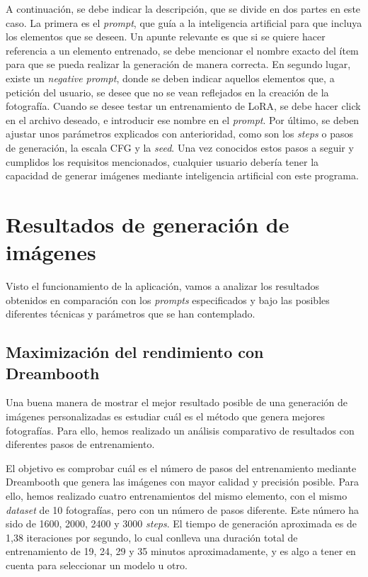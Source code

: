 A continuación, se debe indicar la descripción, que se divide en dos partes en este caso. La primera es el \textit{prompt}, que guía a la inteligencia artificial para que incluya los elementos que se deseen. Un apunte relevante es que si se quiere hacer referencia a un elemento entrenado, se debe mencionar el nombre exacto del ítem para que se pueda realizar la generación de manera correcta. En segundo lugar, existe un \textit{negative prompt}, donde se deben indicar aquellos elementos que, a petición del usuario, se desee que no se vean reflejados en la creación de la fotografía. Cuando se desee testar un entrenamiento de LoRA, se debe hacer click en el archivo deseado, e introducir ese nombre en el \textit{prompt}. Por último, se deben ajustar unos parámetros explicados con anterioridad, como son los \textit{steps} o pasos de generación, la escala CFG y la \textit{seed}. Una vez conocidos estos pasos a seguir y cumplidos los requisitos mencionados, cualquier usuario debería tener la capacidad de generar imágenes mediante inteligencia artificial con este programa.\\ 

\section{Resultados de generación de imágenes}

Visto el funcionamiento de la aplicación, vamos a analizar los resultados obtenidos en comparación con los \textit{prompts} especificados y bajo las posibles diferentes técnicas y parámetros que se han contemplado.


\subsection{Maximización del rendimiento con Dreambooth}

Una buena manera de mostrar el mejor resultado posible de una generación de imágenes personalizadas es estudiar cuál es el método que genera mejores fotografías. Para ello, hemos realizado un análisis comparativo de resultados con diferentes pasos de entrenamiento.

El objetivo es comprobar cuál es el número de pasos del entrenamiento mediante Dreambooth que genera las imágenes con mayor calidad y precisión posible. Para ello, hemos realizado cuatro entrenamientos del mismo elemento, con el mismo \textit{dataset} de 10 fotografías, pero con un número de pasos diferente. Este número ha sido de 1600, 2000, 2400 y 3000 \textit{steps}. El tiempo de generación aproximada es de 1,38 iteraciones por segundo, lo cual conlleva una duración total de entrenamiento de 19, 24, 29 y 35 minutos aproximadamente, y es algo a tener en cuenta para seleccionar un modelo u otro.\\


